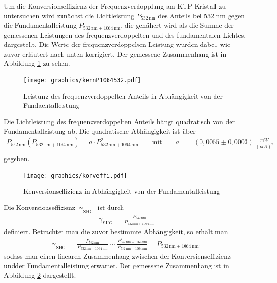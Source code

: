 \documentclass[twoside,colorback,accentcolor=tud4c,11pt]{tudreport}
\begin{document}
Um die Konversionseffizienz der Frequenzverdopplung am KTP-Kristall zu untersuchen wird zunächst die Lichtleistung $P_{532\,\text{nm}}$ des Anteils bei 532 nm gegen die Fundamentalleistung $P_{532\,\text{nm}+1064\,\text{nm}}$, die genähert wird als die Summe der gemessenen Leistungen des frequenzverdoppelten und des fundamentalen Lichtes, dargestellt. Die Werte der frequenzverdoppelten Leistung wurden dabei, wie zuvor erläutert nach unten korrigiert. Der gemessene Zusammenhang ist in Abbildung \ref{a_4.4_3} zu sehen.
\begin{figure}[H]
\centering
   	\begin{minipage}[b]{0.85\textwidth}
   	\texttt{[image: graphics/kennP1064532.pdf]}
  	\label{a_4.4_3}
   	\end{minipage}
\caption{Leistung des frequenzverdoppelten Anteils in Abhängigkeit von der Fundaentalleistung}	
\end{figure}
Die Lichtleistung des frequenzverdoppelten Anteils hängt quadratisch von der Fundamentalleistung ab. Die quadratische Abhängigkeit ist über  
\begin{align*}
P_{532\,\text{nm}}(P_{532\,\text{nm}+1064\,\text{nm}})=a\cdot P^2_{532\,\text{nm}+1064\,\text{nm}} \qquad \text{mit} \qquad
a&=(0,0055\pm0,0003)\,\frac{\si{mW}}{(\si{mA})^2}\\
\end{align*}
gegeben.
\begin{figure}[H]
\centering
   	\begin{minipage}[b]{0.85\textwidth}
   	\texttt{[image: graphics/konveffi.pdf]}
  	\label{a_4.4_4}
   	\end{minipage}
\caption{Konversionseffizienz in Abhängigkeit von der Fundamentalleistung}	
\end{figure}
\pagebreak
Die Konversionseffizienz $\upgamma_{\text{SHG}}$ ist durch
\begin{align*}
\upgamma_{\text{SHG}}=\frac{P_{532\,\text{nm}}}{P_{532\,\text{nm}+1064\,\text{nm}}}
\end{align*}
definiert.
Betrachtet man die zuvor bestimmte Abhängigkeit, so erhält man
\begin{align*}
\upgamma_{\text{SHG}}=\frac{P_{532\,\text{nm}}}{P_{532\,\text{nm}+1064\,\text{nm}}}\sim\frac{P^2_{532\,\text{nm}+1064\,\text{nm}}}{P_{532\,\text{nm}+1064\,\text{nm}}}=P_{532\,\text{nm}+1064\,\text{nm}},
\end{align*}
sodass man einen linearen Zusammenhang zwischen der Konversionseffizienz undder Fundamentalleistung erwartet. Der gemessene Zusammenhang ist in Abbildung \ref{a_4.4_4} dargestellt. 
\end{document}
